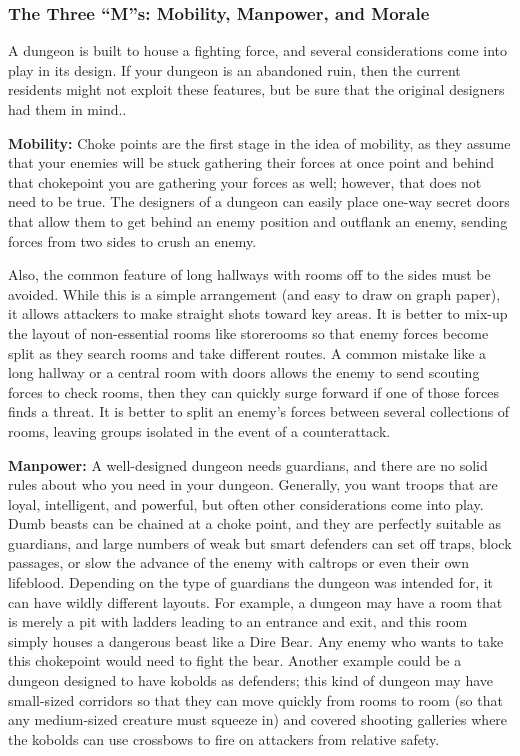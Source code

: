 \subsubsection{The Three ``M''s: Mobility, Manpower, and Morale}

A dungeon is built to house a fighting force, and several considerations come into play in its design. If your dungeon is an abandoned ruin, then the current residents might not exploit these features, but be sure that the original designers had them in mind..

\textbf{Mobility:} Choke points are the first stage in the idea of mobility, as they assume that your enemies will be stuck gathering their forces at once point and behind that chokepoint you are gathering your forces as well; however, that does not need to be true. The designers of a dungeon can easily place one-way secret doors that allow them to get behind an enemy position and outflank an enemy, sending forces from two sides to crush an enemy.

Also, the common feature of long hallways with rooms off to the sides must be avoided. While this is a simple arrangement (and easy to draw on graph paper), it allows attackers to make straight shots toward key areas. It is better to mix-up the layout of non-essential rooms like storerooms so that enemy forces become split as they search rooms and take different routes. A common mistake like a long hallway or a central room with doors allows the enemy to send scouting forces to check rooms, then they can quickly surge forward if one of those forces finds a threat. It is better to split an enemy's forces between several collections of rooms, leaving groups isolated in the event of a counterattack.

\textbf{Manpower:} A well-designed dungeon needs guardians, and there are no solid rules about who you need in your dungeon. Generally, you want troops that are loyal, intelligent, and powerful, but often other considerations come into play. Dumb beasts can be chained at a choke point, and they are perfectly suitable as guardians, and large numbers of weak but smart defenders can set off traps, block passages, or slow the advance of the enemy with caltrops or even their own lifeblood. Depending on the type of guardians the dungeon was intended for, it can have wildly different layouts. For example, a dungeon may have a room that is merely a pit with ladders leading to an entrance and exit, and this room simply houses a dangerous beast like a Dire Bear. Any enemy who wants to take this chokepoint would need to fight the bear. Another example could be a dungeon designed to have kobolds as defenders; this kind of dungeon may have small-sized corridors so that they can move quickly from rooms to room (so that any medium-sized creature must squeeze in) and covered shooting galleries where the kobolds can use crossbows to fire on attackers from relative safety.

